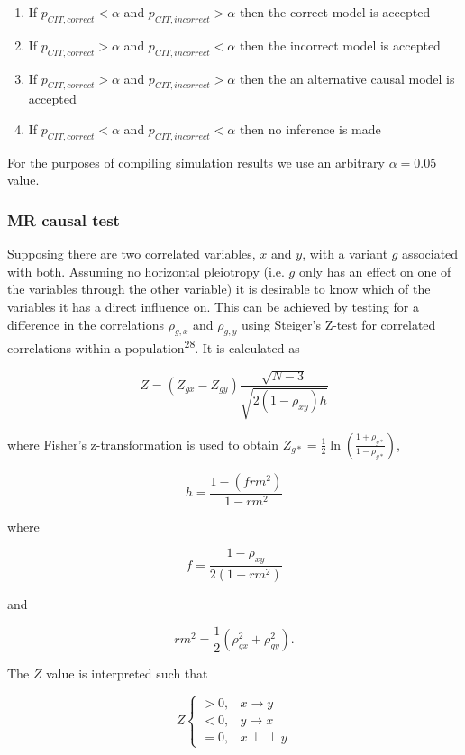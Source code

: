 \documentclass[]{article}
\begin{document}
\begin{enumerate}
\def\labelenumi{\arabic{enumi}.}
\itemsep1pt\parskip0pt
\item
  If \(p_{CIT,correct} < \alpha\) and \(p_{CIT,incorrect} > \alpha\)
  then the correct model is accepted
\item
  If \(p_{CIT,correct} > \alpha\) and \(p_{CIT,incorrect} < \alpha\)
  then the incorrect model is accepted
\item
  If \(p_{CIT,correct} > \alpha\) and \(p_{CIT,incorrect} > \alpha\)
  then the an alternative causal model is accepted
\item
  If \(p_{CIT,correct} < \alpha\) and \(p_{CIT,incorrect} < \alpha\)
  then no inference is made
\end{enumerate}

For the purposes of compiling simulation results we use an arbitrary
\(\alpha = 0.05\) value.

\subsubsection{MR causal test}\label{mr-causal-test}

Supposing there are two correlated variables, \(x\) and \(y\), with a
variant \(g\) associated with both. Assuming no horizontal pleiotropy
(i.e. \(g\) only has an effect on one of the variables through the other
variable) it is desirable to know which of the variables it has a direct
influence on. This can be achieved by testing for a difference in the
correlations \(\rho_{g, x}\) and \(\rho_{g, y}\) using Steiger's Z-test
for correlated correlations within a population\textsuperscript{28}. It
is calculated as

\[
Z = (Z_{gx} - Z_{gy}) \frac{\sqrt{N-3}}{\sqrt{2(1-\rho_{xy})h}}
\]

where Fisher's z-transformation is used to obtain
\(Z_{g*} = \frac{1}{2} \ln \left ( \frac{1+\rho_{g*}}{1-\rho_{g*}} \right )\),

\[
h = \frac{1 - (frm^2)} {1 - rm^2}
\]

where

\[
f = \frac{1 - \rho_{xy}}{2(1 - rm^2)}
\]

and

\[
rm^2 = \frac{1}{2}(\rho_{gx}^2 + \rho_{gy}^2).
\]

The \(Z\) value is interpreted such that

\[
Z \left\{
\begin{array}{ll}
> 0, & x \to y\\
< 0, & y \to x\\
= 0, & x \perp\!\!\!\perp y 
\end{array} \right.
\]
\end{document}
